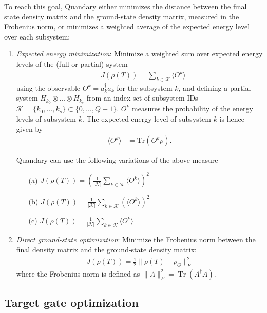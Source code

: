 \documentclass[11pt]{article}
\DeclareMathOperator{\Tr}{Tr}
\begin{document}
To reach this goal, Quandary either minimizes the distance between the final state
density matrix and the ground-state density matrix, measured in the Frobenius
norm, or minimizes a weighted average of the expected energy level over each subsystem:
\begin{enumerate}
  \item \textit{Expected energy minimization}: Minimize a weighted sum over
    expected energy levels of the (full or partial) system
    \begin{align}
       \quad J(\rho(T)) = \sum_{k\in \mathcal{K}} \langle O^k \rangle 
    \end{align}
    using the observable $O^k = a_k^\dag a_k$ for the subsystem $k$, and defining a partial system
    $H_{k_0}\otimes \dots \otimes H_{k_s}$ from an index set of
    subsystem IDs $\mathcal{K}=\{k_0,\dots,k_s\}\subset
    \{0,\dots,Q-1\}$. 
    $O^k$ measures the probability of the energy levels of subsystem $k$. The
   expected energy level of subsystem $k$ is hence given by 
  \begin{align}
    \langle O^k \rangle &= \mbox{Tr}(O^k\rho).
    \label{eq:expected_energy1}
  \end{align}
    
    Quandary can use the following variations of the
    above measure
    \begin{enumerate}
      \item[(a)] $J(\rho(T)) =
        \left(\frac{1}{|\mathcal{K}|}\sum_{k\in\mathcal{K}}\langle O^k \rangle
        \right)^2$
      \item[(b)] $J(\rho(T)) =
        \frac{1}{|\mathcal{K}|}\sum_{k\in\mathcal{K}}\left(\langle O^k \rangle
        \right)^2 $
      \item[(c)] $J(\rho(T)) =
        \frac{1}{|\mathcal{K}|}\sum_{k\in\mathcal{K}}\langle O^k \rangle$
    \end{enumerate}
  \item \textit{Direct ground-state optimization}: Minimize the Frobenius norm
    between the final density matrix and the ground-state density matrix:
    \begin{align}\label{eq:ground-state-obj}
      J(\rho(T)) = \frac 12 \| \rho(T) - \rho_G \|^2_F 
    \end{align}
    where the Frobenius norm is defined as $\|A\|^2_F = \Tr(A^{\dagger}A)$.
\end{enumerate}

\subsection{Target gate optimization}
\end{document}
